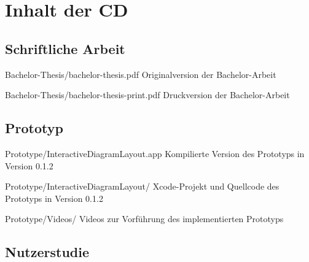 
\chapter{Inhalt der CD}
\label{chapter:cd-content}

\newenvironment{fileslist}{
    \renewcommand\descriptionlabel[1]{\texttt{##1}}
    \setlength{\leftmargini}{0em}
    \begin{description}[style=nextline]
}{
    \end{description}
}

\section{Schriftliche Arbeit}

\begin{fileslist}

\item[Bachelor-Thesis/bachelor-thesis.pdf] 
Originalversion der Bachelor-Arbeit

\item[Bachelor-Thesis/bachelor-thesis-print.pdf] 
Druckversion der Bachelor-Arbeit

\end{fileslist}

\section{Prototyp}

\begin{fileslist}

\item[Prototype/InteractiveDiagramLayout.app]
Kompilierte Version des Prototyps in Version 0.1.2

\item[Prototype/InteractiveDiagramLayout/] 
Xcode-Projekt und Quellcode des Prototyps in Version 0.1.2

\item[Prototype/Videos/] 
Videos zur Vorführung des implementierten Prototyps

\end{fileslist}

\section{Nutzerstudie}
\label{sec:files-user-study}

